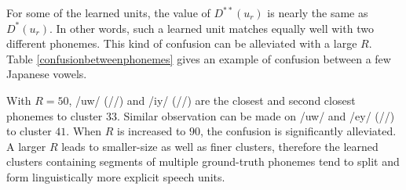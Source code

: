\documentclass[a4paper]{article}
\begin{document}
For some of the learned units, the value of $D^{**} (u_r)$ is nearly the same as $D^* (u_r)$.
In other words, such a learned unit matches equally well with two different phonemes. This kind of confusion can be alleviated with a large $R$. Table \ref{confusionbetweenphonemes} gives an example of confusion between a few Japanese vowels. 
\begin{table}[htbp]
\centering
\caption{Speech units mapped to /uw/ with $R=50$ and $90$}
\label{confusionbetweenphonemes}

\end{table}
With $R=50$, /uw/ (/\textturnm/) and /iy/ (//) are the closest and second closest phonemes to cluster $33$. Similar observation can be made on /uw/ and /ey/ (//) to cluster $41$.
When $R$ is increased to $90$, the confusion is significantly alleviated.
A larger $R$ leads to smaller-size as well as finer clusters, therefore the learned clusters containing segments of multiple ground-truth phonemes tend to split and form linguistically more explicit speech units.


\end{document}
